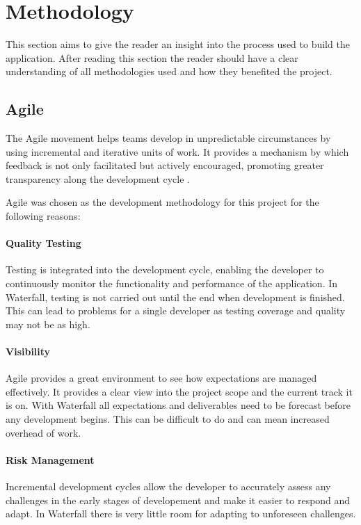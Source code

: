 \section{Methodology}
\label{sec:methodology}
This section aims to give the reader an insight into the process used to build the application. After reading this section the reader should have a clear understanding of all methodologies used and how they benefited the project.

\subsection{Agile}
\label{sub:agile}
The Agile movement helps teams develop in unpredictable circumstances by using incremental and iterative units of work. It provides a mechanism by which feedback is not only facilitated but actively encouraged, promoting greater transparency along the development cycle \citep{Agile2016}.

Agile was chosen as the development methodology for this project for the following reasons:

\paragraph{Quality Testing} Testing is integrated into the development cycle, enabling the developer to continuously monitor the functionality and performance of the application. In Waterfall, testing is not carried out until the end when development is finished. This can lead to problems for a single developer as testing coverage and quality may not be as high. 

\paragraph{Visibility} Agile provides a great environment to see how expectations are managed effectively. It provides a clear view into the project scope and the current track it is on. With Waterfall all expectations and deliverables need to be forecast before any development begins. This can be difficult to do and can mean increased overhead of work.

\paragraph{Risk Management} Incremental development cycles allow the developer to accurately assess any challenges in the early stages of developement and make it easier to respond and adapt. In Waterfall there is very little room for adapting to unforeseen challenges.

